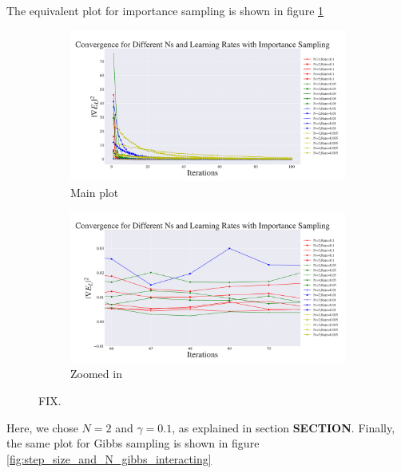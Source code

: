 \documentclass[a4paper, 10pt]{article}
\begin{document}
The equivalent plot for importance sampling is shown in figure \ref{fig:step_size_and_N_importance_interacting}
\begin{figure}[ht!]
	\centering
	\begin{subfigure}[b]{0.8\textwidth}
		\centering
		\includegraphics[width=\textwidth]{../Results/grad_importance_interacting.pdf}
		\caption{Main plot}
	\end{subfigure}
	\begin{subfigure}[b]{0.8\textwidth}
		\centering
		\includegraphics[width=\textwidth]{../Results/grad_importance_interacting_zoom.pdf}
		\caption{Zoomed in}
	\end{subfigure}
	\caption{FIX.}\label{fig:step_size_and_N_importance_interacting}
\end{figure}
Here, we chose $N=2$ and $\gamma=0.1$, as explained in section \textbf{SECTION}.
Finally, the same plot for Gibbs sampling is shown in figure \ref{fig:step_size_and_N_gibbs_interacting}
\end{document}
